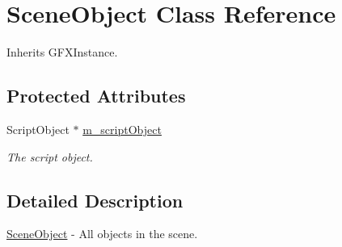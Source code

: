 \hypertarget{class_scene_object}{\section{Scene\-Object Class Reference}
\label{class_scene_object}
}


Inherits G\-F\-X\-Instance.

\subsection*{Protected Attributes}
\begin{DoxyCompactItemize}
\item 
\hypertarget{class_scene_object_a8387ccd12e35609acda57f774edf18ed}{Script\-Object $\ast$ \hyperlink{class_scene_object_a8387ccd12e35609acda57f774edf18ed}{m\-\_\-script\-Object}}\label{class_scene_object_a8387ccd12e35609acda57f774edf18ed}

\begin{DoxyCompactList}\small\item\em The script object. \end{DoxyCompactList}\end{DoxyCompactItemize}


\subsection{Detailed Description}
\hyperlink{class_scene_object}{Scene\-Object} -\/ All objects in the scene. 